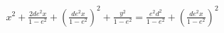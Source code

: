 \documentclass[preview]{standalone}
\begin{document}
\begin{align*}
x^2+\frac{2de^2x}{1-e^2}+(\frac{de^2x}{1-e^2})^2+\frac{y^2}{1-e^2}=\frac{e^2d^2}{1-e^2}+(\frac{de^2x}{1-e^2})^2
\end{align*}
\end{document}
